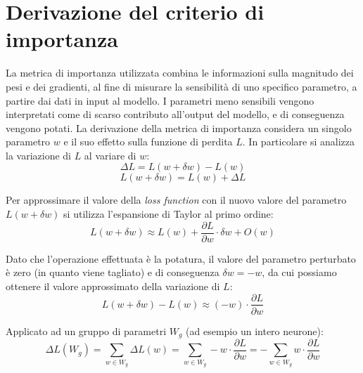 \section{Derivazione del criterio di importanza}
La metrica di importanza utilizzata combina le informazioni sulla magnitudo dei
pesi e dei gradienti, al fine di misurare la sensibilità di uno specifico
parametro, a partire dai dati in input al modello. I parametri meno sensibili
vengono interpretati come di scarso contributo all'output del modello, e di
conseguenza vengono potati. La derivazione della metrica di importanza
considera un singolo parametro $w$ e il suo effetto sulla funzione di perdita
$L$. In particolare si analizza la variazione di $L$ al variare di $w$:
\begin{equation}
    \Delta L = L(w + \delta w) - L(w)
\end{equation}
\begin{equation}
    L(w + \delta w) = L(w) + \Delta L
\end{equation}

Per approssimare il valore della \textit{loss function} con il nuovo valore del
parametro $L(w + \delta w)$ si utilizza l'espansione di Taylor al primo ordine:
\begin{equation}
    L(w + \delta w) \approx L(w) + \frac{\partial L}{\partial w} \cdot \delta w + {O}(w)
\end{equation}

Dato che l'operazione effettuata è la potatura, il valore del parametro
perturbato è zero (in quanto viene tagliato) e di conseguenza $\delta w = -w$,
da cui possiamo ottenere il valore approssimato della variazione di $L$:
\begin{equation}
    L(w + \delta w) - L(w) \approx (-w) \cdot \frac{\partial L}{\partial w}
\end{equation}

Applicato ad un gruppo di parametri $W_g$ (ad esempio un intero neurone):
\begin{equation}
    \Delta L(W_g) = \sum_{w \in W_g} \Delta L(w) = \sum_{w \in W_g} -w \cdot \frac{\partial L}{\partial w} = - \sum_{w \in W_g} w \cdot \frac{\partial L}{\partial w}
\end{equation}

